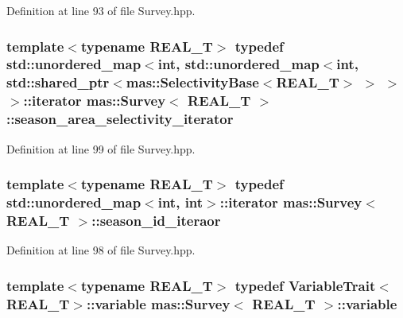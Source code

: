 Definition at line 93 of file Survey.\-hpp.

\hypertarget{structmas_1_1_survey_a75fb76cac18f90a25965ce77bdb6b429}{
\subsubsection[{season\-\_\-area\-\_\-selectivity\-\_\-iterator}]{\setlength{\rightskip}{0pt plus 5cm}template$<$typename R\-E\-A\-L\-\_\-\-T$>$ typedef std\-::unordered\-\_\-map$<$int, std\-::unordered\-\_\-map$<$int, std\-::shared\-\_\-ptr$<${\bf mas\-::\-Selectivity\-Base}$<$R\-E\-A\-L\-\_\-\-T$>$ $>$ $>$ $>$\-::iterator {\bf mas\-::\-Survey}$<$ R\-E\-A\-L\-\_\-\-T $>$\-::{\bf season\-\_\-area\-\_\-selectivity\-\_\-iterator}}}\label{structmas_1_1_survey_a75fb76cac18f90a25965ce77bdb6b429}


Definition at line 99 of file Survey.\-hpp.

\hypertarget{structmas_1_1_survey_a609a3e09a088bcc4f5bed6fdb565566e}{
\subsubsection[{season\-\_\-id\-\_\-iteraor}]{\setlength{\rightskip}{0pt plus 5cm}template$<$typename R\-E\-A\-L\-\_\-\-T$>$ typedef std\-::unordered\-\_\-map$<$int, int$>$\-::iterator {\bf mas\-::\-Survey}$<$ R\-E\-A\-L\-\_\-\-T $>$\-::{\bf season\-\_\-id\-\_\-iteraor}}}\label{structmas_1_1_survey_a609a3e09a088bcc4f5bed6fdb565566e}


Definition at line 98 of file Survey.\-hpp.

\hypertarget{structmas_1_1_survey_ae91896013e1a3403f7e3d79b1f845966}{
\subsubsection[{variable}]{\setlength{\rightskip}{0pt plus 5cm}template$<$typename R\-E\-A\-L\-\_\-\-T$>$ typedef {\bf Variable\-Trait}$<$R\-E\-A\-L\-\_\-\-T$>$\-::{\bf variable} {\bf mas\-::\-Survey}$<$ R\-E\-A\-L\-\_\-\-T $>$\-::{\bf variable}}}\label{structmas_1_1_survey_ae91896013e1a3403f7e3d79b1f845966}


